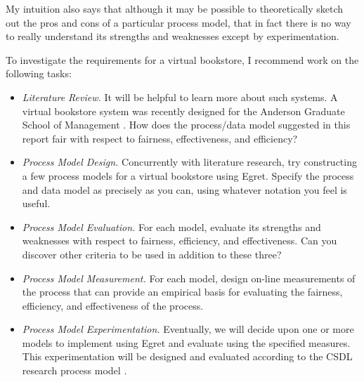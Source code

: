 My intuition also says that although it may be possible to theoretically
sketch out the pros and cons of a particular process model, that in fact
there is no way to really understand its strengths and weaknesses except by
experimentation. 

To investigate the requirements for a virtual bookstore, I recommend work
on the following tasks:

\begin{itemize}
  
\item {\em Literature Review.} It will be helpful to learn more about such
  systems.  A virtual bookstore system was recently designed for the Anderson
  Graduate School of Management \cite{bookstore-AGSM94}.  How does the
  process/data model suggested in this report fair with respect to fairness,
  effectiveness, and efficiency?

\item {\em Process Model Design.} Concurrently with literature research,
  try constructing a few process models for a virtual bookstore using Egret.
  Specify the process and data model as precisely as you can, using whatever
  notation you feel is useful.

\item {\em Process Model Evaluation.} For each model, evaluate its
  strengths and weaknesses with respect to fairness, efficiency, and
  effectiveness.  Can you discover other criteria to be used in addition to
  these three?
  
\item {\em Process Model Measurement.} For each model, design on-line
  measurements of the process that can provide an empirical basis for
  evaluating the fairness, efficiency, and effectiveness of the process.
  
\item {\em Process Model Experimentation.} Eventually, we will decide upon
  one or more models to implement using Egret and evaluate using the
  specified measures.  This experimentation will be designed and 
  evaluated according to the CSDL research process model \cite{csdl-ro-93-01}. 

\end{itemize}





